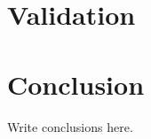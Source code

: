\documentclass[12pt,a4paper,openright,twoside]{book}
\begin{document}
\chapter{Validation} %
\label{chap:validation}

\chapter{Conclusion}
\label{chap:conclusions}

Write conclusions here.



\backmatter




\end{document}
